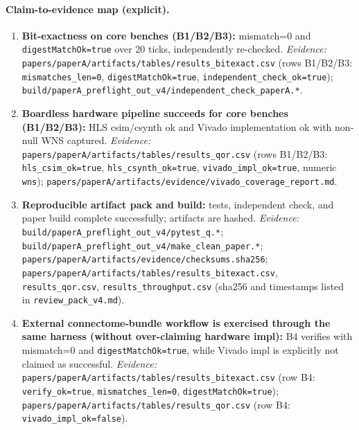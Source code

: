 \paragraph{Claim-to-evidence map (explicit).}
\begin{enumerate}
\item[\textbf{C1}] \textbf{Bit-exactness on core benches (B1/B2/B3):} mismatch=0 and \texttt{digestMatchOk=true} over 20 ticks, independently re-checked.
\emph{Evidence:} \texttt{papers/paperA/artifacts/tables/results\_bitexact.csv} (rows B1/B2/B3: \texttt{mismatches\_len=0}, \texttt{digestMatchOk=true}, \texttt{independent\_check\_ok=true}); \texttt{build/paperA\_preflight\_out\_v4/independent\_check\_paperA.*}.
\item[\textbf{C2}] \textbf{Boardless hardware pipeline succeeds for core benches (B1/B2/B3):} HLS csim/csynth ok and Vivado implementation ok with non-null WNS captured.
\emph{Evidence:} \texttt{papers/paperA/artifacts/tables/results\_qor.csv} (rows B1/B2/B3: \texttt{hls\_csim\_ok=true}, \texttt{hls\_csynth\_ok=true}, \texttt{vivado\_impl\_ok=true}, numeric \texttt{wns}); \texttt{papers/paperA/artifacts/evidence/vivado\_coverage\_report.md}.
\item[\textbf{C3}] \textbf{Reproducible artifact pack and build:} tests, independent check, and paper build complete successfully; artifacts are hashed.
\emph{Evidence:} \texttt{build/paperA\_preflight\_out\_v4/pytest\_q.*}; \texttt{build/paperA\_preflight\_out\_v4/make\_clean\_paper.*}; \texttt{papers/paperA/artifacts/evidence/checksums.sha256}; \texttt{papers/paperA/artifacts/tables/results\_bitexact.csv}, \texttt{results\_qor.csv}, \texttt{results\_throughput.csv} (sha256 and timestamps listed in \texttt{review\_pack\_v4.md}).
\item[\textbf{C4}] \textbf{External connectome-bundle workflow is exercised through the same harness (without over-claiming hardware impl):} B4 verifies with mismatch=0 and \texttt{digestMatchOk=true}, while Vivado impl is explicitly not claimed as successful.
\emph{Evidence:} \texttt{papers/paperA/artifacts/tables/results\_bitexact.csv} (row B4: \texttt{verify\_ok=true}, \texttt{mismatches\_len=0}, \texttt{digestMatchOk=true}); \texttt{papers/paperA/artifacts/tables/results\_qor.csv} (row B4: \texttt{vivado\_impl\_ok=false}).
\end{enumerate}
